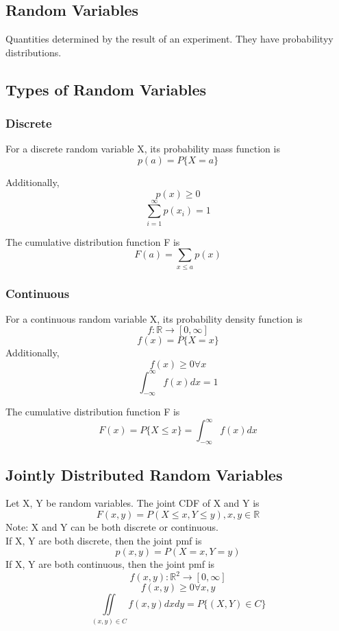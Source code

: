 \subsection{Random Variables}
\begin{defi}
    Quantities determined by the result of an experiment. They have probabilityy distributions.
\end{defi}
\subsection{Types of Random Variables}
\subsubsection{Discrete}
\begin{defi}
    For a discrete random variable X, its probability mass function is
    \[p(a) = P\{X=a\}\]

    Additionally, 
    \[p(x) \geq 0\]
    \[\sum_{i=1}^{\infty} p(x_i) = 1\]
\end{defi}
\begin{defi}
    The cumulative distribution function F is
    \[F(a) = \sum_{x\leq a}p(x)\]
\end{defi}
\subsubsection{Continuous}
\begin{defi}
    For a continuous random variable X, its probability density function is
    \[f:\mathbb{R}\rightarrow[0,\infty]\]
    \[f(x) = P\{X=x\}\]
    Additionally,
    \[f(x) \geq 0 \forall x\]
    \[\int_{-\infty}^{\infty}f(x)dx = 1\]
\end{defi}
\begin{defi}
    The cumulative distribution function F is
    \[F(x) = P\{X\leq x\} 
    = \int_{-\infty}^{\infty}f(x)dx\]
\end{defi}

\subsection{Jointly Distributed Random Variables}
Let X, Y be random variables. The joint CDF of X and Y is 
\[ F(x, y) = P(X\leq x, Y\leq y), x,y\in\mathbb{R} \]
Note: X and Y can be both discrete or continuous.\\

If X, Y are both discrete, then the joint pmf is
\[ p(x, y) = P(X=x, Y=y) \]
If X, Y are both continuous, then the joint pmf is
\[ f(x, y) : \mathbb{R}^2\rightarrow [0,\infty] \]
\[ f(x,y) \geq 0 \forall x,y \]
\[ \iint\limits_{(x,y)\in C} f(x,y) dxdy = P\{(X,Y) \in C\} \]

